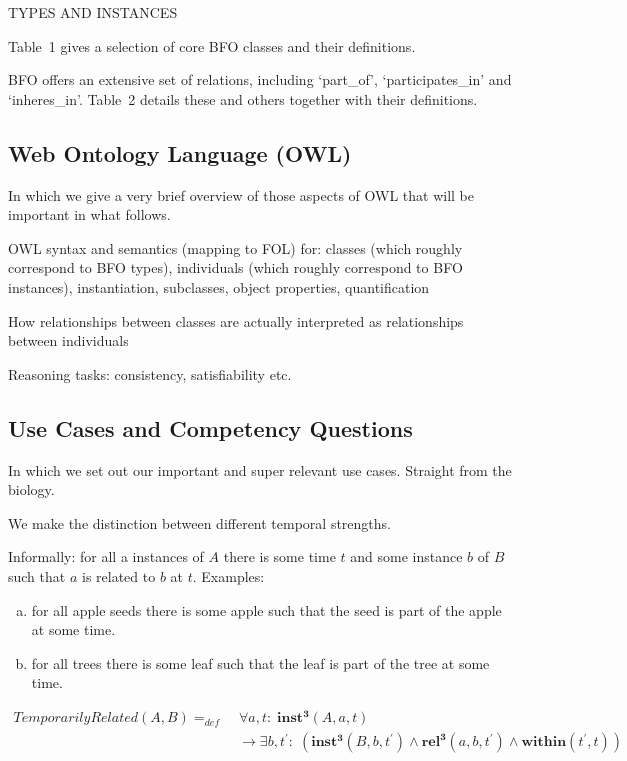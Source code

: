 \documentclass[10pt]{bmc_article}
\newcommand{\mirel}[1]{\ensuremath{\mathrm{\mathbf{#1}}}}
\newcommand{\mclass}[1]{\ensuremath{\mathit{#1}}}
\newcommand{\mrel}[2]{\mirel{#1^#2}}
\newcommand{\mrelt}[1]{\mrel{#1}{3}}
\newenvironment{bmcformat}{\baselineskip20pt\sloppy\setboolean{publ}{false}}{\baselineskip20pt\sloppy}
\begin{document}
\begin{bmcformat}
TYPES AND INSTANCES

Table~1 gives a selection of core BFO classes and their definitions.

BFO offers an extensive set of relations, including `part\_of', `participates\_in' and `inheres\_in'. 
Table~2 details these and others together with their definitions.

\subsection*{Web Ontology Language (OWL)}

In which we give a very brief overview of those aspects of OWL that will be important in what follows.

OWL syntax and semantics (mapping to FOL) for: classes (which roughly correspond to BFO types), individuals (which roughly correspond to BFO instances), instantiation, subclasses, object properties, quantification

How relationships between classes are actually interpreted as relationships between individuals

Reasoning tasks: consistency, satisfiability etc. 


\subsection*{Use Cases and Competency Questions}

In which we set out our important and super relevant use cases. Straight from the biology. 

We make the distinction between different temporal strengths. 


Informally: for all a instances of \mclass{A} there is some time $t$ and some instance $b$ of
\mclass{B} such that $a$ is related to $b$ at $t$. Examples: 
\begin{enumerate}[(a)]
\item for all apple seeds there is
some apple such that the seed is part of the apple at some time. 
\item for all
trees there is some leaf such that the leaf is part of the tree at some time.
\end{enumerate}

\begin{equation}
\begin{split}
\mclass{TemporarilyRelated}(\mclass{A},\mclass{B}) =_{def}&\;
\forall a, t:\; \mrelt{inst}(\mclass{A}, a, t) \\
&\ \rightarrow
\exists b, t^\prime:\;(\mrelt{inst}(\mclass{B},b,t^\prime) \wedge
\mrelt{rel}(a,b,t^\prime) \wedge \mirel{within}(t^\prime,t))
\end{split}
\label{eq:temporarily}
\end{equation}


\end{bmcformat}
\end{document}
